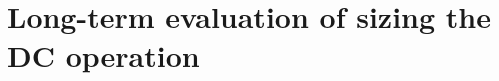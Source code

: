 \chapter[Long-term evaluation of sizing the DC operation]{Long-term evaluation of sizing the DC operation\footnotemark}
\label{chap:ccgrid-extension}













